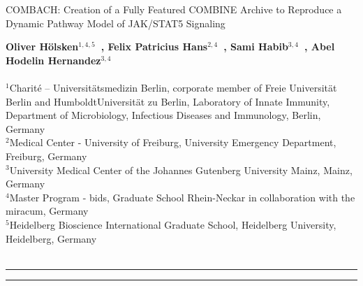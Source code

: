 \begin{titlepage}
{\noindent\huge{COMBACH: Creation of a Fully Featured COMBINE Archive to Reproduce a Dynamic Pathway Model of JAK/STAT5 Signaling}}


\vspace{10pt}
\noindent\textbf{Oliver H\"olsken$^{1,4,5}$~, Felix Patricius Hans$^{2,4}$~, Sami Habib$^{3,4}$~, Abel Hodelin Hernandez$^{3,4}$~}
\\ \\
	\small $^{1}$Charité – Universit\"atsmedizin Berlin, corporate member of Freie Universit\"at Berlin and HumboldtUniversit\"at zu Berlin, Laboratory of Innate Immunity, Department of Microbiology, Infectious Diseases and Immunology, Berlin, Germany \\
	\small $^{2}$Medical Center - University of Freiburg, University Emergency Department, Freiburg, Germany \\
	\small $^{3}$University Medical Center of the Johannes Gutenberg University Mainz, Mainz, Germany \\
	\small $^{4}$Master Program - \ac{bids}, Graduate School Rhein-Neckar in collaboration with the \ac{miracum}, Germany \\
	\small $^{5}$Heidelberg Bioscience International Graduate School, Heidelberg University, Heidelberg, Germany \\
	\\

\hrule

 \hspace{10pt}

\noindent{}

\hrule
\end{titlepage}
